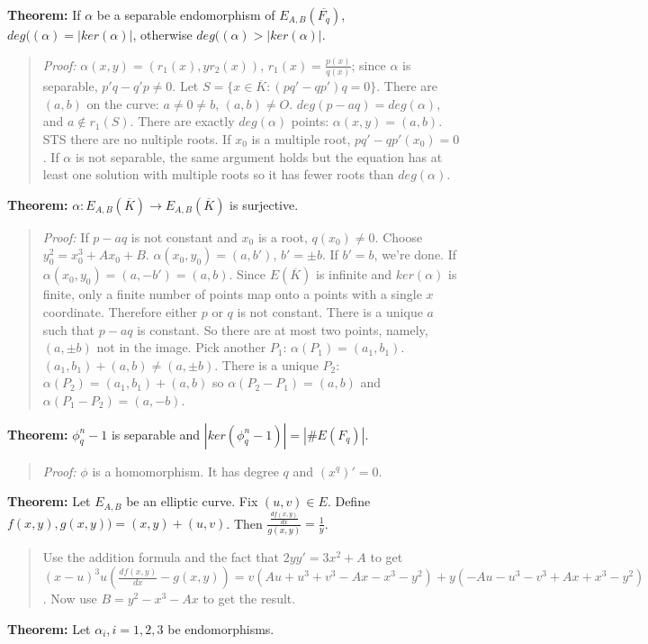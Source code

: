 {\bf Theorem:} If $\alpha$ be a separable endomorphism of $E_{A,B}(\overline{F_q})$, 
$deg((\alpha)= |ker(\alpha)|$, otherwise $deg((\alpha)> |ker(\alpha)|$.
\begin{quote}
\emph{Proof:}
$\alpha(x,y)= (r_1(x), yr_2(x))$, $r_1(x)= {\frac {p(x)}{q(x)}}$; since $\alpha$
is separable, $p'q-q'p \neq 0$.  Let $S= \{x \in \overline{K}: (pq'-qp')q=0\}$.
There are $(a,b)$ on the curve: $a \neq 0 \neq b$, $(a,b) \neq O$.
$deg(p-aq)= deg(\alpha)$, and $a \notin r_1(S)$.  There are exactly $deg(\alpha)$
points: $\alpha(x,y)= (a,b)$.  STS there are no nultiple roots.  If $x_0$ is a multiple
root, $pq'-qp'(x_0) =0$.  If $\alpha$ is not separable, the same argument holds but
the equation has at least one solution with multiple roots so it has fewer roots than
$deg( \alpha )$.
\end{quote}
{\bf Theorem:} $\alpha: E_{A,B}(\overline{K}) \rightarrow E_{A,B}(\overline{K})$ is surjective.
\begin{quote}
\emph{Proof:}
If $p-aq$ is not constant and $x_0$ is a root, $q(x_0) \neq 0$.  Choose $y_0^2= x_0^3+Ax_0+B$.
$\alpha(x_0,y_0)= (a, b')$, $b'= \pm b$.  If $b'=b$, we're done.  If 
$\alpha(x_0 , y_0 )= (a, -b')= (a, b)$.  Since $E(\overline{K})$ is infinite and
$ker( \alpha )$ is finite, only a finite number of points map onto a points
with a single $x$ coordinate.  Therefore either $p$ or $q$ is not constant.
There is a unique $a$ such that $p-aq$ is constant.  So there are at most two
points, namely, $(a, \pm b )$ not in the image.  Pick another
$P_1$: $\alpha(P_1 )=(a_1 , b_1 )$.  $(a_1, b_1 ) + (a,b) \neq (a, \pm b )$.
There is a unique $P_2$: $\alpha (P_2 ) =  ( a_1 , b_1 ) + (a, b)$ so
$\alpha (P_2 - P_1 )= (a,b)$ and
$\alpha (P_1 - P_2 )= (a,-b)$.
\end{quote}
{\bf Theorem:} $\phi_q^n-1$ is separable and $|ker(\phi_q^n-1)|= |\#E(F_q)|$.  
\begin{quote}
\emph{Proof:} 
$\phi$ is a homomorphism.  It has degree $q$ and $(x^q)'=0$.
\end{quote}
{\bf Theorem:}  Let $E_{A, B}$ be an elliptic curve.  Fix $(u,v) \in E$.  Define
$f(x,y), g(x,y)) = (x,y) + (u,v)$. Then ${\frac {\frac {df(x,y)} {dx}} {g(x,y)}}= {\frac 1 y}$.
\begin{quote}
Use the addition formula and the fact that $2y y'= 3x^2+A$ to get
$(x-u)^3u({\frac {df(x,y)}{dx}}-g(x,y))=
v(Au+u^3+v^3-Ax-x^3-y^2) + y(-Au-u^3-v^3+Ax+x^3-y^2)$.  Now use $B=y^2-x^3-Ax$ to get the result.
\end{quote}
{\bf Theorem:}  Let $\alpha_i, i= 1,2,3$ be endomorphisms.  
